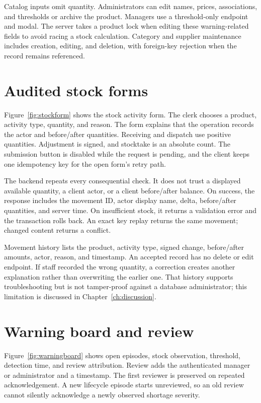 Catalog inputs omit quantity. Administrators can edit names, prices, associations, and thresholds or archive the product. Managers use a threshold-only endpoint and modal. The server takes a product lock when editing these warning-related fields to avoid racing a stock calculation. Category and supplier maintenance includes creation, editing, and deletion, with foreign-key rejection when the record remains referenced.

\section{Audited stock forms}
Figure~\ref{fig:stockform} shows the stock activity form. The clerk chooses a product, activity type, quantity, and reason. The form explains that the operation records the actor and before/after quantities. Receiving and dispatch use positive quantities. Adjustment is signed, and stocktake is an absolute count. The submission button is disabled while the request is pending, and the client keeps one idempotency key for the open form's retry path.


The backend repeats every consequential check. It does not trust a displayed available quantity, a client actor, or a client before/after balance. On success, the response includes the movement ID, actor display name, delta, before/after quantities, and server time. On insufficient stock, it returns a validation error and the transaction rolls back. An exact key replay returns the same movement; changed content returns a conflict.

Movement history lists the product, activity type, signed change, before/after amounts, actor, reason, and timestamp. An accepted record has no delete or edit endpoint. If staff recorded the wrong quantity, a correction creates another explanation rather than overwriting the earlier one. That history supports troubleshooting but is not tamper-proof against a database administrator; this limitation is discussed in Chapter~\ref{ch:discussion}.

\section{Warning board and review}
Figure~\ref{fig:warningboard} shows open episodes, stock observation, threshold, detection time, and review attribution. Review adds the authenticated manager or administrator and a timestamp. The first reviewer is preserved on repeated acknowledgement. A new lifecycle episode starts unreviewed, so an old review cannot silently acknowledge a newly observed shortage severity.


